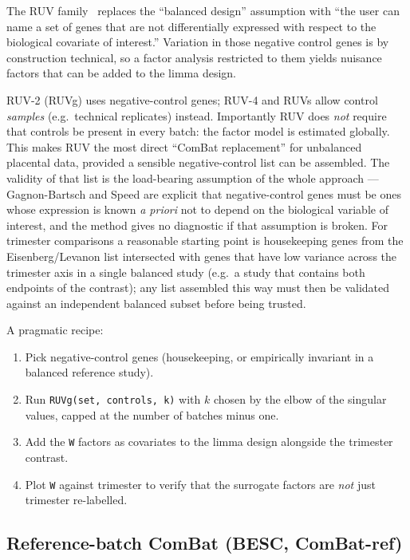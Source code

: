 \documentclass[11pt,a4paper]{article}
\begin{document}
The RUV family~\cite{gagnonbartsch2012,risso2014} replaces the
``balanced design'' assumption with ``the user can name a set of
genes that are not differentially expressed with respect to the
biological covariate of interest.'' Variation in those negative
control genes is by construction technical, so a factor analysis
restricted to them yields nuisance factors that can be added to the
limma design.

RUV-2 (RUVg) uses negative-control genes; RUV-4 and RUVs allow
control \emph{samples} (e.g.\ technical replicates) instead.
Importantly RUV does \emph{not} require that controls be present in
every batch: the factor model is estimated globally. This makes RUV
the most direct ``ComBat replacement'' for unbalanced placental
data, provided a sensible negative-control list can be assembled.
The validity of that list is the load-bearing assumption of the
whole approach --- Gagnon-Bartsch and Speed are explicit that
negative-control genes must be ones whose expression is known
\emph{a priori} not to depend on the biological variable of
interest, and the method gives no diagnostic if that assumption is
broken. For trimester comparisons a reasonable starting point is
housekeeping genes from the Eisenberg/Levanon list intersected with
genes that have low variance across the trimester axis in a single
balanced study (e.g.\ a study that contains both endpoints of the
contrast); any list assembled this way must then be validated
against an independent balanced subset before being trusted.

A pragmatic recipe:
\begin{enumerate}
  \item Pick negative-control genes (housekeeping, or empirically
        invariant in a balanced reference study).
  \item Run \texttt{RUVg(set, controls, k)} with $k$ chosen by the
        elbow of the singular values, capped at the number of
        batches minus one.
  \item Add the \texttt{W} factors as covariates to the limma
        design alongside the trimester contrast.
  \item Plot \texttt{W} against trimester to verify that the
        surrogate factors are \emph{not} just trimester re-labelled.
\end{enumerate}

\subsection{Reference-batch ComBat (BESC, ComBat-ref)}
\end{document}
